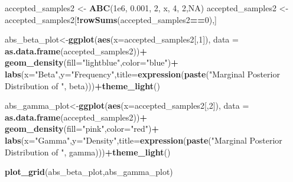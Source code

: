 \documentclass[
]{article}
\newenvironment{Shaded}{\begin{snugshade}}{\end{snugshade}}
\newcommand{\AttributeTok}[1]{\textcolor[rgb]{0.13,0.29,0.53}{#1}}
\newcommand{\ConstantTok}[1]{\textcolor[rgb]{0.56,0.35,0.01}{#1}}
\newcommand{\DecValTok}[1]{\textcolor[rgb]{0.00,0.00,0.81}{#1}}
\newcommand{\FloatTok}[1]{\textcolor[rgb]{0.00,0.00,0.81}{#1}}
\newcommand{\FunctionTok}[1]{\textcolor[rgb]{0.13,0.29,0.53}{\textbf{#1}}}
\newcommand{\NormalTok}[1]{#1}
\newcommand{\OtherTok}[1]{\textcolor[rgb]{0.56,0.35,0.01}{#1}}
\newcommand{\SpecialCharTok}[1]{\textcolor[rgb]{0.81,0.36,0.00}{\textbf{#1}}}
\newcommand{\StringTok}[1]{\textcolor[rgb]{0.31,0.60,0.02}{#1}}
\begin{document}
\begin{Shaded}
\begin{Highlighting}[]
\NormalTok{accepted\_samples2 }\OtherTok{\textless{}{-}} \FunctionTok{ABC}\NormalTok{(}\FloatTok{1e6}\NormalTok{, }\FloatTok{0.001}\NormalTok{, }\DecValTok{2}\NormalTok{, x, }\DecValTok{4}\NormalTok{, }\DecValTok{2}\NormalTok{,}\ConstantTok{NA}\NormalTok{)}
\NormalTok{accepted\_samples2 }\OtherTok{\textless{}{-}}\NormalTok{ accepted\_samples2[}\SpecialCharTok{!}\FunctionTok{rowSums}\NormalTok{(accepted\_samples2}\SpecialCharTok{==}\DecValTok{0}\NormalTok{),]}
\end{Highlighting}
\end{Shaded}

\begin{Shaded}
\begin{Highlighting}[]
\NormalTok{abs\_beta\_plot}\OtherTok{\textless{}{-}}\FunctionTok{ggplot}\NormalTok{(}\FunctionTok{aes}\NormalTok{(}\AttributeTok{x=}\NormalTok{accepted\_samples2[,}\DecValTok{1}\NormalTok{]), }\AttributeTok{data =} \FunctionTok{as.data.frame}\NormalTok{(accepted\_samples2))}\SpecialCharTok{+}
  \FunctionTok{geom\_density}\NormalTok{(}\AttributeTok{fill=}\StringTok{"lightblue"}\NormalTok{,}\AttributeTok{color=}\StringTok{"blue"}\NormalTok{)}\SpecialCharTok{+}
  \FunctionTok{labs}\NormalTok{(}\AttributeTok{x=}\StringTok{"Beta"}\NormalTok{,}\AttributeTok{y=}\StringTok{"Frequency"}\NormalTok{,}\AttributeTok{title=}\FunctionTok{expression}\NormalTok{(}\FunctionTok{paste}\NormalTok{(}\StringTok{"Marginal Posterior Distribution of "}\NormalTok{, beta)))}\SpecialCharTok{+}\FunctionTok{theme\_light}\NormalTok{()}

\NormalTok{abs\_gamma\_plot}\OtherTok{\textless{}{-}}\FunctionTok{ggplot}\NormalTok{(}\FunctionTok{aes}\NormalTok{(}\AttributeTok{x=}\NormalTok{accepted\_samples2[,}\DecValTok{2}\NormalTok{]), }\AttributeTok{data =} \FunctionTok{as.data.frame}\NormalTok{(accepted\_samples2))}\SpecialCharTok{+}
  \FunctionTok{geom\_density}\NormalTok{(}\AttributeTok{fill=}\StringTok{"pink"}\NormalTok{,}\AttributeTok{color=}\StringTok{"red"}\NormalTok{)}\SpecialCharTok{+}
  \FunctionTok{labs}\NormalTok{(}\AttributeTok{x=}\StringTok{"Gamma"}\NormalTok{,}\AttributeTok{y=}\StringTok{"Density"}\NormalTok{,}\AttributeTok{title=}\FunctionTok{expression}\NormalTok{(}\FunctionTok{paste}\NormalTok{(}\StringTok{"Marginal Posterior Distribution of "}\NormalTok{, gamma)))}\SpecialCharTok{+}\FunctionTok{theme\_light}\NormalTok{()}

\FunctionTok{plot\_grid}\NormalTok{(abs\_beta\_plot,abs\_gamma\_plot)}
\end{Highlighting}
\end{Shaded}
\end{document}
